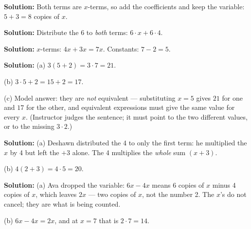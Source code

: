 \documentclass[12pt]{article}
\begin{document}



\textbf{Solution:} Both terms are $x$-terms, so add the coefficients and keep the
variable: $5 + 3 = 8$ copies of $x$. 


\textbf{Solution:} Distribute the 6 to \emph{both} terms: $6 \cdot x + 6 \cdot 4$. 


\textbf{Solution:} $x$-terms: $4x + 3x = 7x$. Constants: $7 - 2 = 5$. 


\textbf{Solution:} (a) $3(5 + 2) = 3 \cdot 7 = 21$. 

(b) $3 \cdot 5 + 2 = 15 + 2 = 17$. 

(c) Model answer: they are \emph{not} equivalent --- substituting $x = 5$ gives $21$
for one and $17$ for the other, and equivalent expressions must give the same value
for every $x$. (Instructor judges the sentence; it must point to the two different
values, or to the missing $3 \cdot 2$.)


\textbf{Solution:} (a) Deshawn distributed the 4 to only the first term: he
multiplied the $x$ by 4 but left the $+3$ alone. The 4 multiplies the \emph{whole}
sum $(x + 3)$.

(b) $4(2 + 3) = 4 \cdot 5 = 20$. 


\textbf{Solution:} (a) Ava dropped the variable: $6x - 4x$ means 6 copies of $x$
minus 4 copies of $x$, which leaves $2x$ --- two copies of $x$, not the number 2.
The $x$'s do not cancel; they are what is being counted.

(b) $6x - 4x = 2x$, and at $x = 7$ that is $2 \cdot 7 = 14$. 

\end{document}
